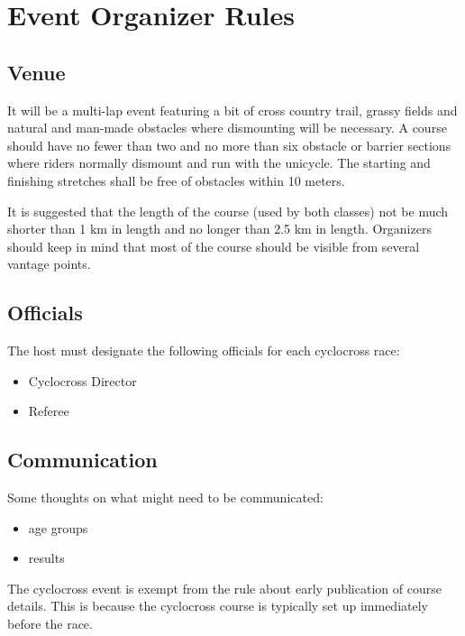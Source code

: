 \chapter{Event Organizer Rules}

\section{Venue}

It will be a multi-lap event featuring a bit of cross country trail, grassy fields and natural and man-made obstacles where dismounting will be necessary.
A course should have no fewer than two and no more than six obstacle or barrier sections where riders normally dismount and run with the unicycle.
The starting and finishing stretches shall be free of obstacles within 10 meters.

It is suggested that the length of the course (used by both classes) not be much shorter than 1 km in length and no longer than 2.5 km in length. 
Organizers should keep in mind that most of the course should be visible from several vantage points.

\section{Officials}

The host must designate the following officials for each cyclocross race:
\begin{itemize}
\item Cyclocross Director
\item Referee
\end{itemize}

\section{Communication}

\begin{comment2016}
Some thoughts on what might need to be communicated:
\begin{itemize}
\item age groups
\item results
\end{itemize}
\end{comment2016}

The cyclocross event is exempt from the rule about early publication of course details. This is because the cyclocross course is typically set up immediately before the race.

